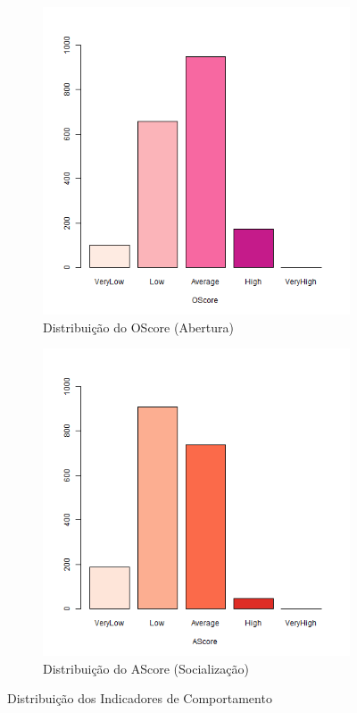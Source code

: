 \documentclass[
	article,			%
	11pt,				%
	oneside,			%
	a4paper,			%
	english,			%
	brazil,				%
	sumario=tradicional
	]{abntex2}
\begin{document}
\begin{figure}[H]
\centering
\begin{subfigure}{.5\textwidth}
  \centering
  \includegraphics[width=\linewidth]{figuras/dist_oscore.png}
  \caption{Distribuição do OScore (Abertura)}
  \label{oscore}
\end{subfigure}%
\begin{subfigure}{.5\textwidth}
  \centering
  \includegraphics[width=\linewidth]{figuras/dist_ascore.png}
  \caption{Distribuição do AScore (Socialização)}
  \label{ascore}
\end{subfigure}
\caption{Distribuição dos Indicadores de Comportamento}
\label{comp2}
\end{figure}
\end{document}

